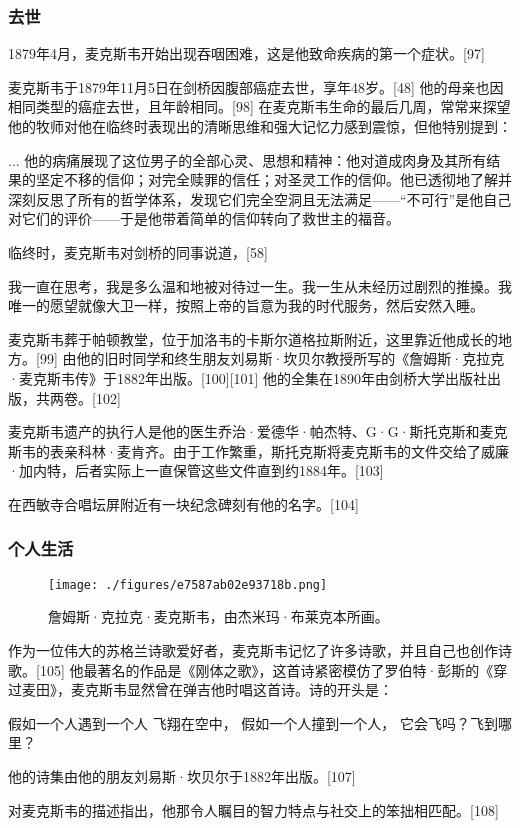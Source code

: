 \subsubsection{去世}  
1879年4月，麦克斯韦开始出现吞咽困难，这是他致命疾病的第一个症状。[97]

麦克斯韦于1879年11月5日在剑桥因腹部癌症去世，享年48岁。[48] 他的母亲也因相同类型的癌症去世，且年龄相同。[98] 在麦克斯韦生命的最后几周，常常来探望他的牧师对他在临终时表现出的清晰思维和强大记忆力感到震惊，但他特别提到：

... 他的病痛展现了这位男子的全部心灵、思想和精神：他对道成肉身及其所有结果的坚定不移的信仰；对完全赎罪的信任；对圣灵工作的信仰。他已透彻地了解并深刻反思了所有的哲学体系，发现它们完全空洞且无法满足——“不可行”是他自己对它们的评价——于是他带着简单的信仰转向了救世主的福音。

临终时，麦克斯韦对剑桥的同事说道，[58]

我一直在思考，我是多么温和地被对待过一生。我一生从未经历过剧烈的推搡。我唯一的愿望就像大卫一样，按照上帝的旨意为我的时代服务，然后安然入睡。

麦克斯韦葬于帕顿教堂，位于加洛韦的卡斯尔道格拉斯附近，这里靠近他成长的地方。[99] 由他的旧时同学和终生朋友刘易斯·坎贝尔教授所写的《詹姆斯·克拉克·麦克斯韦传》于1882年出版。[100][101] 他的全集在1890年由剑桥大学出版社出版，共两卷。[102]

麦克斯韦遗产的执行人是他的医生乔治·爱德华·帕杰特、G·G·斯托克斯和麦克斯韦的表亲科林·麦肯齐。由于工作繁重，斯托克斯将麦克斯韦的文件交给了威廉·加内特，后者实际上一直保管这些文件直到约1884年。[103]

在西敏寺合唱坛屏附近有一块纪念碑刻有他的名字。[104]
\subsubsection{个人生活}
\begin{figure}[ht]
\centering
\texttt{[image: ./figures/e7587ab02e93718b.png]}
\caption{詹姆斯·克拉克·麦克斯韦，由杰米玛·布莱克本所画。} \label{fig_Clerk_9}
\end{figure} 
作为一位伟大的苏格兰诗歌爱好者，麦克斯韦记忆了许多诗歌，并且自己也创作诗歌。[105] 他最著名的作品是《刚体之歌》，这首诗紧密模仿了罗伯特·彭斯的《穿过麦田》，麦克斯韦显然曾在弹吉他时唱这首诗。诗的开头是：

假如一个人遇到一个人  
飞翔在空中，  
假如一个人撞到一个人，  
它会飞吗？飞到哪里？

他的诗集由他的朋友刘易斯·坎贝尔于1882年出版。[107]  

对麦克斯韦的描述指出，他那令人瞩目的智力特点与社交上的笨拙相匹配。[108]

